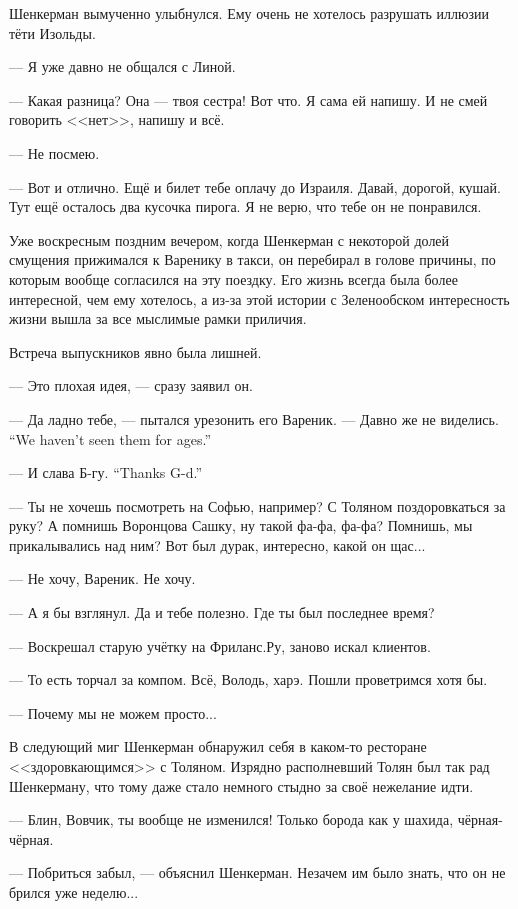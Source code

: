 Шенкерман вымученно улыбнулся.
Ему очень не хотелось разрушать иллюзии тёти Изольды.

--- Я уже давно не общался с Линой.

--- Какая разница?
Она --- твоя сестра!
Вот что.
Я сама ей напишу.
И не смей говорить <<нет>>, напишу и всё.

--- Не посмею.

--- Вот и отлично.
Ещё и билет тебе оплачу до Израиля.
Давай, дорогой, кушай.
Тут ещё осталось два кусочка пирога.
Я не верю, что тебе он не понравился.

\textspace

\asterism

Уже воскресным поздним вечером, когда Шенкерман с некоторой долей смущения прижимался к Варенику в такси, он перебирал в голове причины, по которым вообще согласился на эту поездку.
Его жизнь всегда была более интересной, чем ему хотелось, а из-за этой истории с Зеленообском интересность жизни вышла за все мыслимые рамки приличия.

Встреча выпускников явно была лишней.

--- Это плохая идея, --- сразу заявил он.

--- Да ладно тебе, --- пытался урезонить его Вареник.
{--- Давно же не виделись.}
{``We haven't seen them for ages.''}

{--- И слава Б-гу.}
{``Thanks G-d.''}

--- Ты не хочешь посмотреть на Софью, например?
С Толяном поздоровкаться за руку?
А помнишь Воронцова Сашку, ну такой фа-фа, фа-фа?
Помнишь, мы прикалывались над ним?
Вот был дурак, интересно, какой он щас...

--- Не хочу, Вареник.
Не хочу.

--- А я бы взглянул.
Да и тебе полезно.
Где ты был последнее время?

--- Воскрешал старую учётку на Фриланс.Ру, заново искал клиентов.

--- То есть торчал за компом.
Всё, Володь, харэ.
Пошли проветримся хотя бы.

--- Почему мы не можем просто...

В следующий миг Шенкерман обнаружил себя в каком-то ресторане <<здоровкающимся>> с Толяном.
Изрядно располневший Толян был так рад Шенкерману, что тому даже стало немного стыдно за своё нежелание идти.

--- Блин, Вовчик, ты вообще не изменился!
Только борода как у шахида, чёрная-чёрная.

--- Побриться забыл, --- объяснил Шенкерман.
Незачем им было знать, что он не брился уже неделю...

